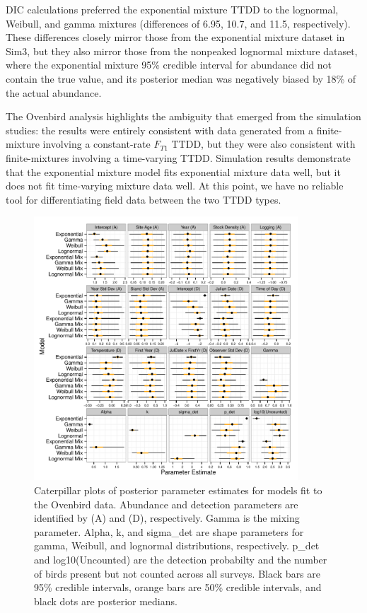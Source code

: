 \documentclass[useAMS,usenatbib,referee,12pt]{article}
\begin{document}
DIC calculations preferred the exponential mixture TTDD to the lognormal, Weibull, and gamma mixtures (differences of 6.95, 10.7, and 11.5, respectively). These differences closely mirror those from the exponential mixture dataset in Sim3, but they also mirror those from the nonpeaked lognormal mixture dataset, where the exponential mixture 95\% credible interval for abundance did not contain the true value, and its posterior median was negatively biased by 18\% of the actual abundance.

The Ovenbird analysis highlights the ambiguity that emerged from the simulation studies: the results were entirely consistent with data generated from a finite-mixture involving a constant-rate $F_{T1}$ TTDD, but they were also consistent with finite-mixtures involving a time-varying TTDD.
Simulation results demonstrate that the exponential mixture model fits exponential mixture data well, but it does not fit time-varying mixture data well.
At this point, we have no reliable tool for differentiating field data between the two TTDD types.



\begin{figure}[h!]\centering
\includegraphics[width=0.88\textwidth]{OVEN/oven_sum/OVEN_posteriors.pdf}
\caption{\label{ovenposteriors} Caterpillar plots of posterior parameter estimates for models fit to the Ovenbird data.  
Abundance and detection parameters are identified by (A) and (D), respectively.  
Gamma is the mixing parameter.  
Alpha, k, and sigma\_det are shape parameters for gamma, Weibull, and lognormal distributions, respectively.  
p\_det and log10(Uncounted) are the detection probabilty and the number of birds present but not counted across all surveys.  
Black bars are 95\% credible intervals, orange bars are 50\% credible intervals, and black dots are posterior medians.}
\end{figure}
\end{document}
